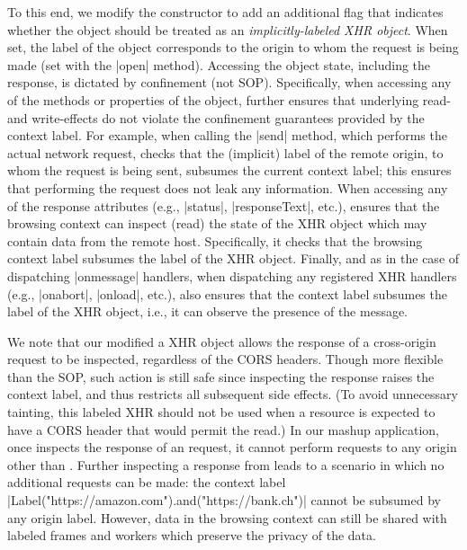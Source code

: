 To this end, we modify the \xhr{} constructor to add an additional
flag that indicates whether the object should be treated as an
\emph{implicitly-labeled XHR object}.
%
When set, the  label of the object corresponds to the origin
to whom the request is being made (set with the \js|open| method). 
Accessing the object state, including the response, is dictated by
confinement (not SOP).
%
Specifically, when accessing any of the methods or properties of
the object, \sys{} further ensures that underlying read- and
write-effects do not violate the confinement guarantees provided by
the context label.
%
For example, when calling the \js|send| method, which performs the
actual network request, \sys{} checks that the (implicit) label of the
remote origin, to whom the request is being sent, subsumes the current
context label;
%
this ensures that performing the request does not leak any
information.
%
When accessing any of the response attributes (e.g., \js|status|,
\js|responseText|, etc.), \sys{} ensures that the browsing context can inspect
(read) the state of the XHR object which may contain data from the remote host.
%
Specifically, it checks that the browsing context label subsumes the
label of the XHR object.
%
Finally, and as in the case of dispatching \js|onmessage| handlers,
when dispatching any registered XHR
handlers (e.g., \js|onabort|, \js|onload|, etc.), \sys{} also ensures
that the context label subsumes the label of the XHR object, i.e., it
can observe the presence of the message.
 
We note that our modified a XHR object allows the response of a
cross-origin request to be inspected, regardless of the CORS headers.
%
Though more flexible than the SOP, such action is still safe since inspecting
the response raises the context label, and thus restricts all subsequent side
effects.
%
(To avoid unnecessary tainting, this labeled XHR should not be used
when a resource is expected to have a CORS header that would permit
the read.)
%
In our mashup application, once  inspects the
response of an  request, it cannot perform requests
to any origin other than .
%
Further inspecting a response from  leads to a scenario
in which no additional requests can be made: the context label  
\js|Label("https://amazon.com").and("https://bank.ch")|
cannot be subsumed by any origin label. 
%
However, data in the browsing context can still be shared with labeled
frames and workers which preserve the privacy of the data.
% 

